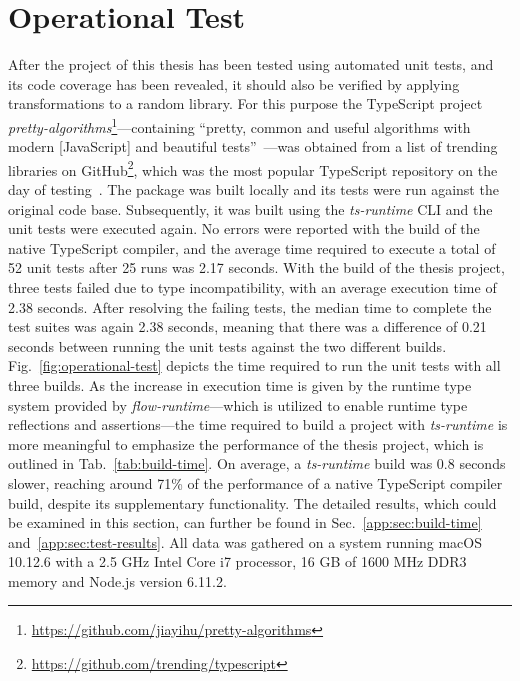 \section{Operational Test}
\label{sec:operational-test}

After the project of this thesis has been tested using automated unit tests, and its code coverage has been revealed, it should also be verified by applying transformations to a random library. For this purpose the TypeScript project \emph{pretty-algorithms}\footnote{\url{https://github.com/jiayihu/pretty-algorithms}}---containing ``pretty, common and useful algorithms with modern [JavaScript] and beautiful tests''~\cite{Evaluation:pretty-algorithms}---was obtained from a list of trending libraries on GitHub\footnote{\url{https://github.com/trending/typescript}}, which was the most popular TypeScript repository on the day of testing~\cite{GitHub:Trending:Archive}. The package was built locally and its tests were run against the original code base. Subsequently, it was built using the \emph{ts-runtime} CLI and the unit tests were executed again. No errors were reported with the build of the native TypeScript compiler, and the average time required to execute a total of 52 unit tests after 25 runs was 2.17 seconds. With the build of the thesis project, three tests failed due to type incompatibility, with an average execution time of 2.38 seconds. After resolving the failing tests, the median time to complete the test suites was again 2.38 seconds, meaning that there was a difference of 0.21 seconds between running the unit tests against the two different builds. Fig.~\ref{fig:operational-test} depicts the time required to run the unit tests with all three builds.
As the increase in execution time is given by the runtime type system provided by \emph{flow-runtime}---which is utilized to enable runtime type reflections and assertions---the time required to build a project with \emph{ts-runtime} is more meaningful to emphasize the performance of the thesis project, which is outlined in Tab.~\ref{tab:build-time}. On average, a \emph{ts-runtime} build was 0.8 seconds slower, reaching around 71\% of the performance of a native TypeScript compiler build, despite its supplementary functionality.
The detailed results, which could be examined in this section, can further be found in Sec.~\ref{app:sec:build-time} and~\ref{app:sec:test-results}. All data was gathered on a system running macOS 10.12.6 with a 2.5 GHz Intel Core i7 processor, 16 GB of 1600 MHz DDR3 memory and Node.js version 6.11.2.

